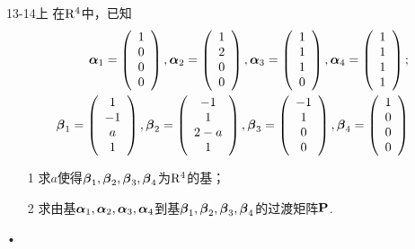 \begin{frame}
   \begin{footnotesize}

    \begin{exampleblock}{13-14上}
      在$\mathrm{R}^4$中，已知
$$
\begin{aligned}
\boldsymbol{\alpha}_1=\left(
\begin{array}{c}
1\\0\\0\\0
\end{array}
\right),
\boldsymbol{\alpha}_2=\left(
\begin{array}{c}
1\\2\\0\\0
\end{array}
\right),
\boldsymbol{\alpha}_3=\left(
\begin{array}{c}
1\\1\\1\\0
\end{array}
\right),
\boldsymbol{\alpha}_4=\left(
\begin{array}{c}
1\\1\\1\\1
\end{array}
\right);\\
\boldsymbol{\beta}_1=\left(
\begin{array}{c}
1\\-1\\a\\1
\end{array}
\right),
\boldsymbol{\beta}_2=\left(
\begin{array}{c}
-1\\1\\2-a\\1
\end{array}
\right),
\boldsymbol{\beta}_3=\left(
\begin{array}{c}
-1\\1\\0\\0
\end{array}
\right),
\boldsymbol{\beta}_4=\left(
\begin{array}{c}
1\\0\\0\\0
\end{array}
\right)
\end{aligned}
$$
\begin{itemize}
\item[1] 求$a$使得$\boldsymbol{\beta}_1,\boldsymbol{\beta}_2,\boldsymbol{\beta}_3,\boldsymbol{\beta}_4$为$\mathrm{R}^4$的基；
\item[2] 求由基$\boldsymbol{\alpha}_1,\boldsymbol{\alpha}_2,\boldsymbol{\alpha}_3,\boldsymbol{\alpha}_4$到基$\boldsymbol{\beta}_1,\boldsymbol{\beta}_2,\boldsymbol{\beta}_3,\boldsymbol{\beta}_4$的过渡矩阵$\mathbf{P}$.
\end{itemize}•
    \end{exampleblock}

  
  \end{footnotesize}
\end{frame}


